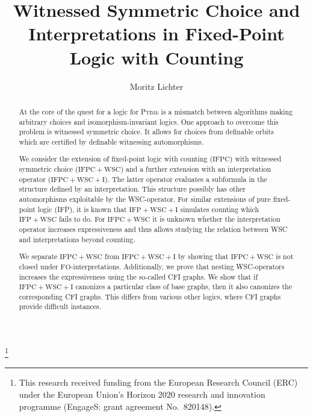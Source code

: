 \documentclass[]{lmcs}
\newcommand{\PTime}{\textsc{Ptime}}
\newcommand{\FO}{\ensuremath{\mathrm{FO}}}
\newcommand{\IFPWSC}{\ensuremath{\mathrm{IFP{+}WSC}}}
\newcommand{\IFPWSCI}{\ensuremath{\mathrm{IFP{+}WSC{+}I}}}
\newcommand{\IFPC}{\ensuremath{\mathrm{IFPC}}}
\newcommand{\IFPCWSC}{\ensuremath{\mathrm{IFPC{+}WSC}}}
\newcommand{\IFPCWSCI}{\ensuremath{\mathrm{IFPC{+}WSC{+}I}}}
\begin{document}
	\title[Witnessed Symmetric Choice and Interpretations in IFPC]{Witnessed Symmetric Choice
		and Interpretations
		in Fixed-Point Logic with Counting}
	
	\author[Moritz Lichter]{Moritz Lichter
		}
	\address{RWTH Aachen University, Chair of Logic and Theory of Discrete Systems, Ahornstraße 55, 52074 Aachen, Germany}
	\thanks{This research received funding from the European Research Council (ERC) under the European Union’s Horizon 2020 research and innovation programme (EngageS: grant agreement No.\ 820148).}
	
\begin{abstract}
	At the core of the quest for a logic for \PTime{}
	is a mismatch between algorithms making arbitrary choices
	and isomorphism-invariant logics.
	One approach to overcome this problem is
	witnessed symmetric choice.
	It allows for choices from definable orbits
	which are certified by definable witnessing automorphisms.
	
	We consider the extension of fixed-point logic with counting (\IFPC{})
	with witnessed symmetric choice (\IFPCWSC{})
	and a further extension with an interpretation operator (\IFPCWSCI{}).
	The latter operator evaluates a subformula in the structure defined by an interpretation.
	This structure  possibly has other automorphisms
	exploitable by the WSC-operator.
	For similar extensions of pure fixed-point logic (IFP),
	it is known that
	\IFPWSCI{} simulates counting which \IFPWSC{} fails to do.
	For \IFPCWSC{} it is unknown whether the interpretation operator increases expressiveness and thus allows studying the relation between WSC and interpretations beyond counting.
	
	We separate \IFPCWSC{} from \IFPCWSCI{}
	by showing that \IFPCWSC{} is not closed under \FO-interpretations.
	Additionally, we prove that nesting WSC-operators increases the expressiveness
	using the so-called CFI graphs.
	We show that if \IFPCWSCI{} canonizes a particular class of base graphs,
	then it also canonizes the corresponding CFI graphs.
	This differs from various other logics,
	where CFI graphs provide difficult instances.
\end{abstract}


\maketitle
\end{document}
